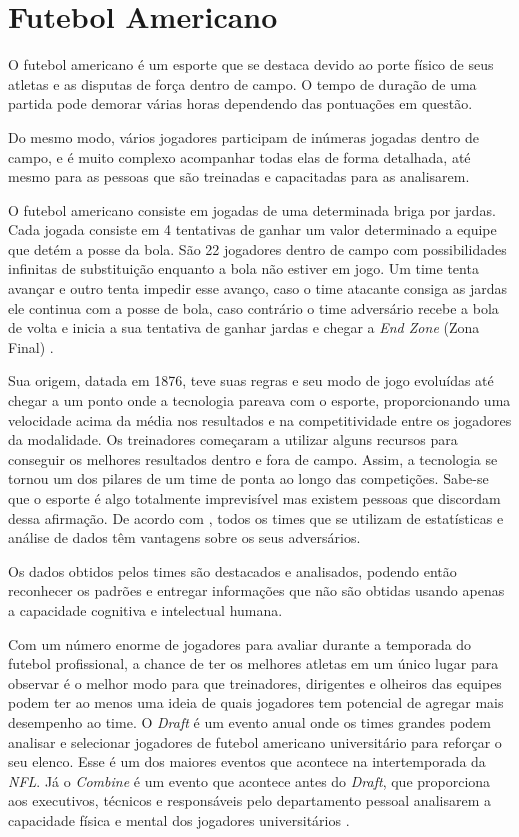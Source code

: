 \section{\textbf{{Futebol Americano}}}
\label{futebol-americano}

O futebol americano é um esporte que se destaca devido ao porte físico de seus atletas e as disputas de força dentro de campo. O tempo de duração de uma partida pode demorar várias horas dependendo das pontuações em questão.

Do mesmo modo, vários jogadores participam de inúmeras jogadas dentro de campo, e é muito complexo acompanhar todas elas de forma detalhada, até mesmo para as pessoas que são treinadas e capacitadas para as analisarem.

O futebol americano consiste em jogadas de uma determinada briga por jardas. Cada jogada consiste em 4 tentativas de ganhar um valor determinado a equipe que detém a posse da bola. São 22 jogadores dentro de campo com possibilidades infinitas de substituição enquanto a bola não estiver em jogo. Um time tenta avançar e outro tenta impedir esse avanço, caso o time atacante consiga as jardas ele continua com a posse de bola, caso contrário o time adversário recebe a bola de volta e inicia a sua tentativa de ganhar jardas e chegar a \textit{End Zone} (Zona Final) \cite{NFL2019}.

Sua origem, datada em 1876, teve suas regras e seu modo de jogo evoluídas até chegar a um ponto onde a tecnologia pareava com o esporte, proporcionando uma velocidade acima da média nos resultados e na competitividade entre os jogadores da modalidade. Os treinadores começaram a utilizar alguns recursos para conseguir os melhores resultados dentro e fora de campo. Assim, a tecnologia se tornou um dos pilares de um time de ponta ao longo das competições. Sabe-se que o esporte é algo totalmente imprevisível mas existem pessoas que discordam dessa afirmação. De acordo com , todos os times que se utilizam de estatísticas e análise de dados têm vantagens sobre os seus adversários.

Os dados obtidos pelos times são destacados e analisados, podendo então reconhecer os padrões e entregar informações que não são obtidas usando apenas a capacidade cognitiva e intelectual humana.

Com um número enorme de jogadores para avaliar durante a temporada do futebol profissional, a chance de ter os melhores atletas em um único lugar para observar é o melhor modo para que treinadores, dirigentes e olheiros das equipes podem ter ao menos uma ideia de quais jogadores tem potencial de agregar mais desempenho ao time. O \textit{Draft} é um evento anual onde os times grandes podem analisar e selecionar jogadores de futebol americano universitário para reforçar o seu elenco. Esse é um dos maiores eventos que acontece na intertemporada da \textit{NFL}. Já o \textit{Combine} é um evento que acontece antes do \textit{Draft}, que proporciona aos executivos, técnicos e responsáveis pelo departamento pessoal analisarem a capacidade física e mental dos jogadores universitários \cite{MCGEE2003}.

